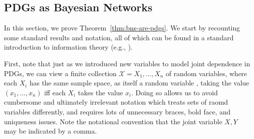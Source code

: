 \documentclass[letterpaper]{article} %
\theoremstyle{plain}
\theoremstyle{definition}
\theoremstyle{remark}
\newcommand{\V}{\mathcal V}
\begin{document}
	\subsection{PDGs as Bayesian Networks}
In this section, we prove Theorem~\ref{thm:bns-are-pdgs}.  
We start by recounting some standard results and notation, all of
which can be found in a standard introduction to information
theory (e.g., \cite[Chapter 1]{mackay2003information}).  

First, note that just as we introduced new variables to model joint dependence
in PDGs, we can view a finite collection $\mathcal X=X_1, \ldots, X_n$ of random
variables, where each $X_i$ has the same sample space, as itself a random
variable%
, taking the value $(x_1, \ldots, x_n)$ iff each $X_i$ takes the value $x_i$.
Doing so allows us to avoid cumbersome and ultimately irrelevant notation which treats sets of raomd variables differently, and requires lots of unnecessary braces, bold face, and uniqueness issues. 
Note the notational convention that the joint variable $X,Y$ may be indicated by a comma.
\end{document}
